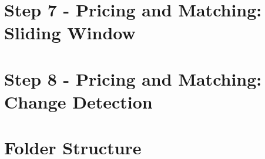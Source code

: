     \section*{Step 7 - Pricing and Matching: Sliding Window}
    \label{sect:Step 7 - Pricing and Matching: Sliding Window}
		
    \section*{Step 8 - Pricing and Matching: Change Detection}
    \label{sect:Step 8 - Pricing and Matching: Change Detection}
	
     \section*{Folder Structure}
     \label{sect:Folder Structure}
     	
